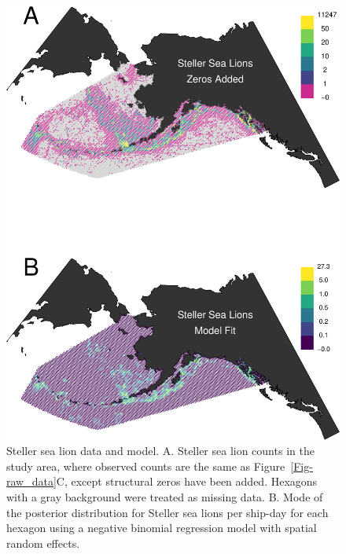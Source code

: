 \documentclass[11pt, titlepage]{article}
\begin{document}
\begin{spacing}{1.9}
\begin{flushleft}
\begin{figure}[H]
  \begin{center}
  \includegraphics[width=.75\linewidth]{figures/Fig-SeaLionFit-crop}
  \end{center}
  \caption{Steller sea lion data and model. A. Steller sea lion counts in the study area, where observed counts are the same as Figure~\ref{Fig-raw_data}C, except structural zeros have been added. Hexagons with a gray background were treated as missing data. B. Mode of the posterior distribution for Steller sea lions per ship-day for each hexagon using a negative binomial regression model with spatial random effects.  \label{Fig-SeaLionFit}}         
\end{figure} 


\end{flushleft}
\end{spacing}
\end{document}
